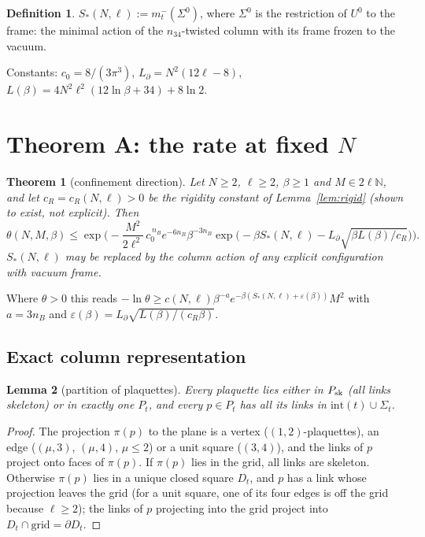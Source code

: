 \documentclass[11pt,a4paper]{article}
\newtheorem{theorem}{Theorem}
\newtheorem{lemma}{Lemma}[section]
\theoremstyle{definition}
\newtheorem{definition}[lemma]{Definition}
\theoremstyle{remark}
\begin{document}
\begin{definition}\label{def:Sstar}
$S_*(N,\ell):=m^-_t(\Sigma^0)$, where $\Sigma^0$ is the restriction of $U^0$ to the frame: the minimal action of the $n_{34}$-twisted column with its frame frozen to the vacuum.
\end{definition}

Constants: $c_0=8/(3\pi^3)$, $L_\partial=N^2(12\ell-8)$, $L(\beta)=4N^2\ell^2(12\ln\beta+34)+8\ln2$.

\section{Theorem A: the rate at fixed $N$}\label{sec:A}

\begin{theorem}[confinement direction]\label{thm:A}
Let $N\ge2$, $\ell\ge2$, $\beta\ge1$ and $M\in2\ell\mathbb{N}$, and let $c_R=c_R(N,\ell)>0$ be the rigidity constant of Lemma~\ref{lem:rigid} (shown to exist, not explicit). Then
\[ \theta(N,M,\beta)\le\exp\Big(-\frac{M^2}{2\ell^2}\,c_0^{\,n_B}e^{-6n_B}\beta^{-3n_B}\exp\big(-\beta S_*(N,\ell)-L_\partial\sqrt{\beta L(\beta)/c_R}\big)\Big). \]
$S_*(N,\ell)$ may be replaced by the column action of any explicit configuration with vacuum frame.
\end{theorem}

Where $\theta>0$ this reads $-\ln\theta\ge c(N,\ell)\beta^{-a}e^{-\beta(S_*(N,\ell)+\varepsilon(\beta))}M^2$ with $a=3n_B$ and $\varepsilon(\beta)=L_\partial\sqrt{L(\beta)/(c_R\beta)}$.

\subsection{Exact column representation}

\begin{lemma}[partition of plaquettes]\label{lem:partition}
Every plaquette lies either in $P_{\rm sk}$ (all links skeleton) or in exactly one $P_t$, and every $p\in P_t$ has all its links in $\mathrm{int}(t)\cup\Sigma_t$.
\end{lemma}
\begin{proof}
The projection $\pi(p)$ to the plane is a vertex ($(1,2)$-plaquettes), an edge ($(\mu,3)$, $(\mu,4)$, $\mu\le2$) or a unit square ($(3,4)$), and the links of $p$ project onto faces of $\pi(p)$.
If $\pi(p)$ lies in the grid, all links are skeleton.
Otherwise $\pi(p)$ lies in a unique closed square $D_t$, and $p$ has a link whose projection leaves the grid (for a unit square, one of its four edges is off the grid because $\ell\ge2$); the links of $p$ projecting into the grid project into $D_t\cap\text{grid}=\partial D_t$.
\end{proof}
\end{document}
